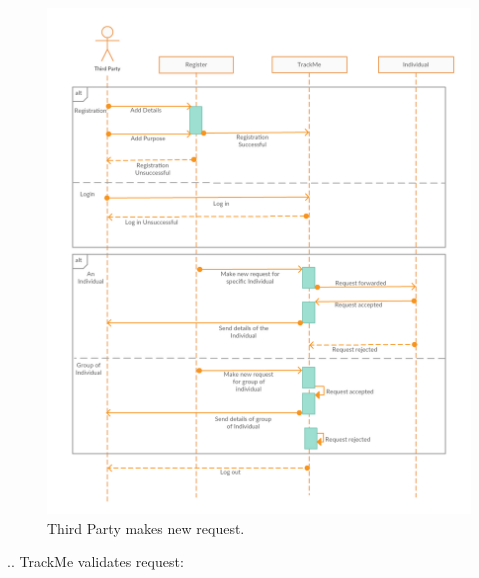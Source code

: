 \begin{figure}[H]
	\begin{center}
		\includegraphics[width=\textwidth]{./RASD_Sequence/2__ThirdParty.png}
      	\caption{Third Party makes new request.}
        \label{TrackMe_seq2}
	\end{center}
\end{figure}
.\newline{}. TrackMe validates request:
